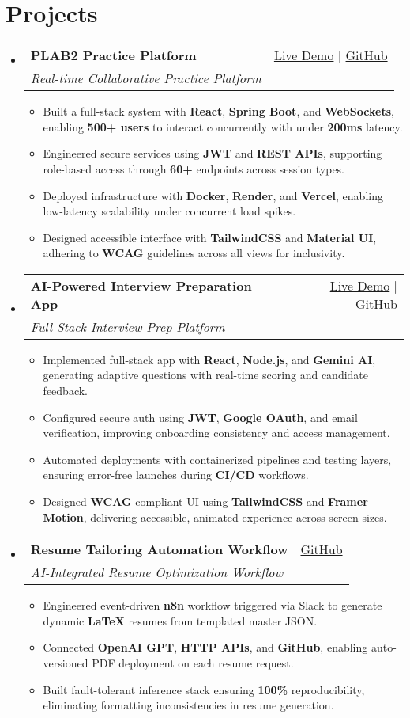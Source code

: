 \documentclass[letterpaper,11pt]{article}
\makeatletter
\newcommand{\resumeItem}[1]{\item\small{#1 \vspace{-2pt}}}
\newcommand{\resumeSubheading}[4]{
  \vspace{-1pt}\item
    \begin{tabular*}{0.97\textwidth}[t]{l@{\extracolsep{\fill}}r}
      \textbf{#1} & #2 \\
      \textit{\small#3} & \textit{\small #4} \\
    \end{tabular*}\vspace{-5pt}
}
\newcommand{\resumeSubHeadingListStart}{\begin{itemize}[leftmargin=*]}
\newcommand{\resumeSubHeadingListEnd}{\end{itemize}}
\newcommand{\resumeItemListStart}{\begin{itemize}}
\newcommand{\resumeItemListEnd}{\end{itemize}\vspace{-5pt}}
\makeatother
\begin{document}
\section{Projects}
  \resumeSubHeadingListStart
    \resumeSubheading
      {\textbf{PLAB2 Practice Platform}}{\href{https://plab2practice.com}{Live Demo} | \href{https://github.com/altansaid/plab2projectnew}{GitHub}}
      {Real-time Collaborative Practice Platform}{}
      \resumeItemListStart
        \resumeItem{Built a full-stack system with \textbf{React}, \textbf{Spring Boot}, and \textbf{WebSockets}, enabling \textbf{500+ users} to interact concurrently with under \textbf{200ms} latency.}
        \resumeItem{Engineered secure services using \textbf{JWT} and \textbf{REST APIs}, supporting role-based access through \textbf{60+} endpoints across session types.}
        \resumeItem{Deployed infrastructure with \textbf{Docker}, \textbf{Render}, and \textbf{Vercel}, enabling low-latency scalability under concurrent load spikes.}
        \resumeItem{Designed accessible interface with \textbf{TailwindCSS} and \textbf{Material UI}, adhering to \textbf{WCAG} guidelines across all views for inclusivity.}
      \resumeItemListEnd

    \resumeSubheading
      {\textbf{AI-Powered Interview Preparation App}}{\href{https://interviewcoach-ai.vercel.app}{Live Demo} | \href{https://github.com/altansaid/interviewcoach-ai}{GitHub}}
      {Full-Stack Interview Prep Platform}{}
      \resumeItemListStart
        \resumeItem{Implemented full-stack app with \textbf{React}, \textbf{Node.js}, and \textbf{Gemini AI}, generating adaptive questions with real-time scoring and candidate feedback.}
        \resumeItem{Configured secure auth using \textbf{JWT}, \textbf{Google OAuth}, and email verification, improving onboarding consistency and access management.}
        \resumeItem{Automated deployments with containerized pipelines and testing layers, ensuring error-free launches during \textbf{CI/CD} workflows.}
        \resumeItem{Designed \textbf{WCAG}-compliant UI using \textbf{TailwindCSS} and \textbf{Framer Motion}, delivering accessible, animated experience across screen sizes.}
      \resumeItemListEnd

    \resumeSubheading
      {\textbf{Resume Tailoring Automation Workflow}}{\href{https://github.com/altansaid/resume-updates}{GitHub}}
      {AI-Integrated Resume Optimization Workflow}{}
      \resumeItemListStart
        \resumeItem{Engineered event-driven \textbf{n8n} workflow triggered via Slack to generate dynamic \textbf{LaTeX} resumes from templated master JSON.}
        \resumeItem{Connected \textbf{OpenAI GPT}, \textbf{HTTP APIs}, and \textbf{GitHub}, enabling auto-versioned PDF deployment on each resume request.}
        \resumeItem{Built fault-tolerant inference stack ensuring \textbf{100\%} reproducibility, eliminating formatting inconsistencies in resume generation.}
      \resumeItemListEnd
  \resumeSubHeadingListEnd
\end{document}
